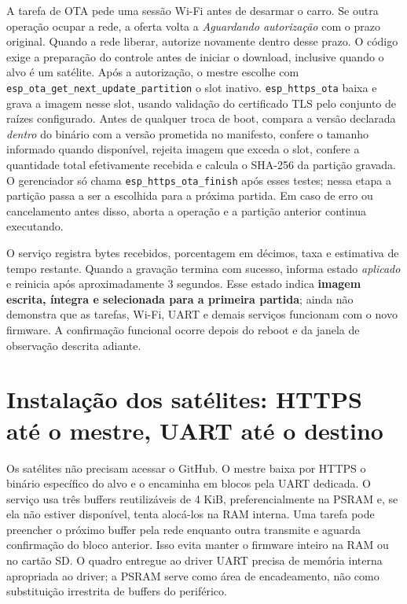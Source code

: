 A tarefa de OTA pede uma sessão Wi-Fi antes de desarmar o carro. Se outra operação ocupar a rede, a oferta volta a \emph{Aguardando autorização} com o prazo original. Quando a rede liberar, autorize novamente dentro desse prazo. O código exige a preparação do controle antes de iniciar o download, inclusive quando o alvo é um satélite.
Após a autorização, o mestre escolhe com \texttt{esp\_ota\_get\_next\_update\_partition} o slot inativo. \texttt{esp\_https\_ota} baixa e grava a imagem nesse slot, usando validação do certificado TLS pelo conjunto de raízes configurado. Antes de qualquer troca de boot, compara a versão declarada \emph{dentro} do binário com a versão prometida no manifesto, confere o tamanho informado quando disponível, rejeita imagem que exceda o slot, confere a quantidade total efetivamente recebida e calcula o SHA-256 da partição gravada. O gerenciador só chama \texttt{esp\_https\_ota\_finish} após esses testes; nessa etapa a partição passa a ser a escolhida para a próxima partida. Em caso de erro ou cancelamento antes disso, aborta a operação e a partição anterior continua executando.

O serviço registra bytes recebidos, porcentagem em décimos, taxa e estimativa de tempo restante. Quando a gravação termina com sucesso, informa estado \emph{aplicado} e reinicia após aproximadamente 3 segundos. Esse estado indica \textbf{imagem escrita, íntegra e selecionada para a primeira partida}; ainda não demonstra que as tarefas, Wi-Fi, UART e demais serviços funcionam com o novo firmware. A confirmação funcional ocorre depois do reboot e da janela de observação descrita adiante.

\section{Instalação dos satélites: HTTPS até o mestre, UART até o destino}
Os satélites não precisam acessar o GitHub. O mestre baixa por HTTPS o binário específico do alvo e o encaminha em blocos pela UART dedicada. O serviço usa três buffers reutilizáveis de 4 KiB, preferencialmente na PSRAM e, se ela não estiver disponível, tenta alocá-los na RAM interna. Uma tarefa pode preencher o próximo buffer pela rede enquanto outra transmite e aguarda confirmação do bloco anterior. Isso evita manter o firmware inteiro na RAM ou no cartão SD. O quadro entregue ao driver UART precisa de memória interna apropriada ao driver; a PSRAM serve como área de encadeamento, não como substituição irrestrita de buffers do periférico.

